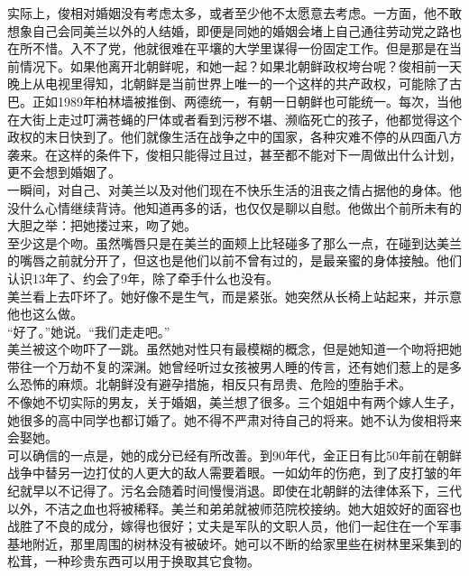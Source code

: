 实际上，俊相对婚姻没有考虑太多，或者至少他不太愿意去考虑。一方面，他不敢想象自己会同美兰以外的人结婚，即便是同她的婚姻会堵上自己通往劳动党之路也在所不惜。入不了党，他就很难在平壤的大学里谋得一份固定工作。但是那是在当前情况下。如果他离开北朝鲜呢，和她一起？如果北朝鲜政权垮台呢？俊相前一天晚上从电视里得知，北朝鲜是当前世界上唯一的一个这样的共产政权，可能除了古巴。正如1989年柏林墙被推倒、两德统一，有朝一日朝鲜也可能统一。每次，当他在大街上走过叮满苍蝇的尸体或者看到污秽不堪、濒临死亡的孩子，他都觉得这个政权的末日快到了。他们就像生活在战争之中的国家，各种灾难不停的从四面八方袭来。在这样的条件下，俊相只能得过且过，甚至都不能对下一周做出什么计划，更不会想到婚姻了。\\

一瞬间，对自己、对美兰以及对他们现在不快乐生活的沮丧之情占据他的身体。他没什么心情继续背诗。他知道再多的话，也仅仅是聊以自慰。他做出个前所未有的大胆之举：把她搂过来，吻了她。\\

至少这是个吻。虽然嘴唇只是在美兰的面颊上比轻碰多了那么一点，在碰到达美兰的嘴唇之前就分开了，但这也是他们以前不曾有过的，是最亲蜜的身体接触。他们认识13年了、约会了9年，除了牵手什么也没有。\\

美兰看上去吓坏了。她好像不是生气，而是紧张。她突然从长椅上站起来，并示意他也这么做。\\

“好了。”她说。“我们走走吧。”\\

美兰被这个吻吓了一跳。虽然她对性只有最模糊的概念，但是她知道一个吻将把她带往一个万劫不复的深渊。她曾经听过女孩被男人睡的传言，还有她们惹上的是多么恐怖的麻烦。北朝鲜没有避孕措施，相反只有昂贵、危险的堕胎手术。\\

不像她不切实际的男友，关于婚姻，美兰想了很多。三个姐姐中有两个嫁人生子，她很多的高中同学也都订婚了。她不得不严肃对待自己的将来。她不认为俊相将来会娶她。\\

可以确信的一点是，她的成分已经有所改善。到90年代，金正日有比50年前在朝鲜战争中替另一边打仗的人更大的敌人需要着眼。一如幼年的伤疤，到了皮打皱的年纪就早以不记得了。污名会随着时间慢慢消退。即使在北朝鲜的法律体系下，三代以外，不洁之血也将被稀释。美兰和弟弟就被师范院校接纳。她大姐姣好的面容也战胜了不良的成分，嫁得也很好；丈夫是军队的文职人员，他们一起住在一个军事基地附近，那里周围的树林没有被破坏。她可以不断的给家里些在树林里采集到的松茸，一种珍贵东西可以用于换取其它食物。\\

